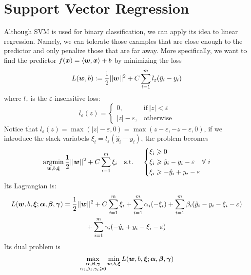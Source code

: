 \section{Support Vector Regression}
Although SVM is used for binary classification, we can apply its idea to linear regression. Namely, we can
tolerate those examples that are close enough to the predictor and only penalize those that are far away.
More specifically, we want to find the predictor $f(\boldsymbol{x}) = \langle\boldsymbol{w}, \boldsymbol{x}\rangle + b$ by minimizing the
loss
\begin{equation}\label{SVR_loss}
    L(\boldsymbol{w}, b) := \frac{1}{2}||\boldsymbol{w}||^2 + C\sum_{i=1}^m l_\varepsilon(\hat{y}_i - y_i)
\end{equation}
where $l_\varepsilon$ is the $\varepsilon$-insensitive loss:
\begin{equation}\label{epsilon_insensitive_loss}
    l_\varepsilon(z) = 
    \begin{cases}
        0, & \text{if}~ |z| < \varepsilon\\
        |z| - \varepsilon, & \text{otherwise}
    \end{cases}
\end{equation}
Notice that $l_\varepsilon(z) = \max(|z| - \varepsilon, 0) = \max(z - \varepsilon, -z - \varepsilon, 0)$, if
we introduce the slack variabels $\xi_i = l_\varepsilon(\hat{y}_i - y_i)$, the problem becomes
\begin{equation}
    \operatorname*{argmin}_{\boldsymbol{w}, b, \boldsymbol{\xi}} \frac{1}{2}||\boldsymbol{w}||^2 + C\sum_{i=1}^m \xi_i \quad\text{s.t.\ }\quad\left\{
    \begin{aligned}
        &\xi_i \geqslant 0\\
        &\xi_i \geqslant \hat{y}_i - y_i - \varepsilon\\
        &\xi_i \geqslant -\hat{y}_i + y_i - \varepsilon
    \end{aligned}\right.\forall~ i
\end{equation}
Its Lagrangian is:
\begin{multline}
    L(\boldsymbol{w}, b, \boldsymbol{\xi}; \boldsymbol{\alpha}, \boldsymbol{\beta}, \boldsymbol{\gamma}) = \frac{1}{2} ||\boldsymbol{w}||^2 + C\sum_{i=1}^m \xi_i
    + \sum_{i=1}^m \alpha_i (-\xi_i) + \sum_{i=1}^m \beta_i (\hat{y}_i - y_i -\xi_i -\varepsilon)
    \\+ \sum_{i=1}^m \gamma_i (-\hat{y}_i + y_i - \xi_i -\varepsilon)
\end{multline}
Its dual problem is 
$$\max_{\substack{\boldsymbol{\alpha}, \boldsymbol{\beta}, \boldsymbol{\gamma}\\ \alpha_i, \beta_i, \gamma_i \geqslant 0}}
\min_{\boldsymbol{w}, b, \boldsymbol{\xi}} L(\boldsymbol{w}, b, \boldsymbol{\xi};\boldsymbol{\alpha}, \boldsymbol{\beta}, \boldsymbol{\gamma})$$

